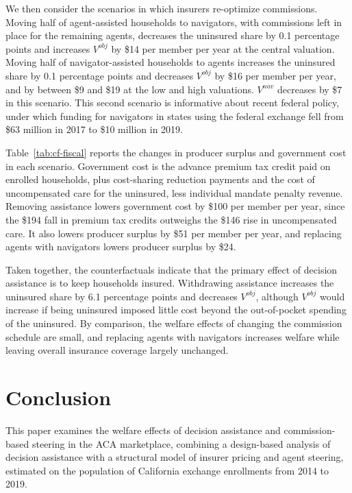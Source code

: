 \documentclass[12pt]{article}
\begin{document}
We then consider the scenarios in which insurers re-optimize commissions. Moving half of agent-assisted households to navigators, with commissions left in place for the remaining agents, decreases the uninsured share by 0.1 percentage points and increases $V^{obj}$ by \$14 per member per year at the central valuation. Moving half of navigator-assisted households to agents increases the uninsured share by 0.1 percentage points and decreases $V^{obj}$ by \$16 per member per year, and by between \$9 and \$19 at the low and high valuations. $V^{nav}$ decreases by \$7 in this scenario. This second scenario is informative about recent federal policy, under which funding for navigators in states using the federal exchange fell from \$63 million in 2017 to \$10 million in 2019.

Table~\ref{tab:cf-fiscal} reports the changes in producer surplus and government cost in each scenario. Government cost is the advance premium tax credit paid on enrolled households, plus cost-sharing reduction payments and the cost of uncompensated care for the uninsured, less individual mandate penalty revenue. Removing assistance lowers government cost by \$100 per member per year, since the \$194 fall in premium tax credits outweighs the \$146 rise in uncompensated care. It also lowers producer surplus by \$51 per member per year, and replacing agents with navigators lowers producer surplus by \$24.

Taken together, the counterfactuals indicate that the primary effect of decision assistance is to keep households insured. Withdrawing assistance increases the uninsured share by 6.1 percentage points and decreases $V^{obj}$, although $V^{obj}$ would increase if being uninsured imposed little cost beyond the out-of-pocket spending of the uninsured. By comparison, the welfare effects of changing the commission schedule are small, and replacing agents with navigators increases welfare while leaving overall insurance coverage largely unchanged.


\section{Conclusion}
\label{sec:conclusion}

This paper examines the welfare effects of decision assistance and commission-based steering in the ACA marketplace, combining a design-based analysis of decision assistance with a structural model of insurer pricing and agent steering, estimated on the population of California exchange enrollments from 2014 to 2019.
\end{document}
